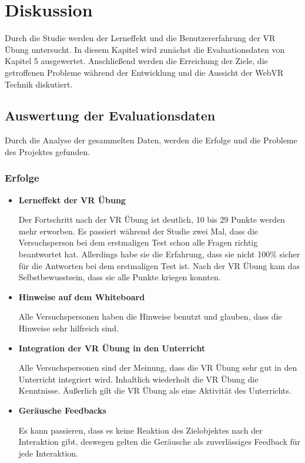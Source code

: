 \chapter{Diskussion}

Durch die Studie werden der Lerneffekt und die Benutzererfahrung der VR Übung untersucht. In diesem Kapitel wird zunächst die Evaluationsdaten von Kapitel 5 ausgewertet. Anschließend werden die Erreichung der Ziele, die getroffenen Probleme während der Entwicklung und die Aussicht der WebVR Technik diskutiert.

\section{Auswertung der Evaluationsdaten}

Durch die Analyse der gesammelten Daten, werden die Erfolge und die Probleme des Projektes gefunden.

\subsection{Erfolge}

\begin{itemize}
    \item \textbf{Lerneffekt der VR Übung}
    
    Der Fortschritt nach der VR Übung ist deutlich, 10 bis 29 Punkte werden mehr erworben. Es passiert während der Studie zwei Mal, dass die Versuchsperson bei dem erstmaligen Test schon alle Fragen richtig beantwortet hat. Allerdings habe sie die Erfahrung, dass sie nicht 100\% sicher für die Antworten bei dem erstmaligen Test ist. Nach der VR Übung kam das Selbstbewusstsein, dass sie alle Punkte kriegen konnten.
    
    \item \textbf{Hinweise auf dem Whiteboard}
    
    Alle Versuchspersonen haben die Hinweise benutzt und glauben, dass die Hinweise sehr hilfreich sind.
    
    \item \textbf{Integration der VR Übung in den Unterricht}
    
    Alle Versuchspersonen sind der Meinung, dass die VR Übung sehr gut in den Unterricht integriert wird. Inhaltlich wiederholt die VR Übung die Kenntnisse. Äußerlich gilt die VR Übung als eine Aktivität des Unterrichts.
    
    \item \textbf{Geräusche Feedbacks}
    
    Es kann passieren, dass es keine Reaktion des Zielobjektes nach der Interaktion gibt, deswegen gelten die Geräusche als zuverlässiges Feedback für jede Interaktion.
    
\end{itemize}

